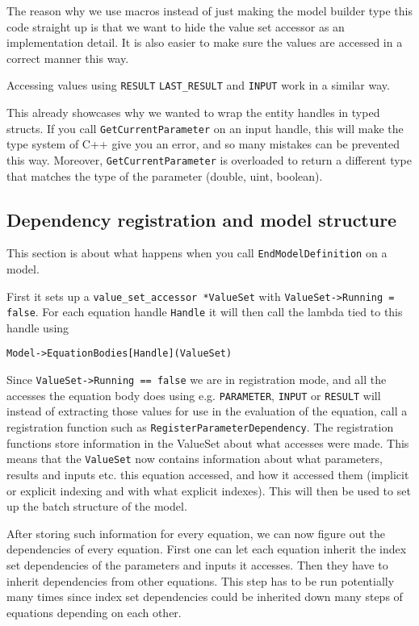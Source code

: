 \documentclass[11pt]{article}
\theoremstyle{definition}
\begin{document}
The reason why we use macros instead of just making the model builder type this code straight up is that we want to hide the value set accessor as an implementation detail. It is also easier  to make sure the values are accessed in a correct manner this way.

Accessing values using {\tt RESULT} {\tt LAST\_RESULT} and {\tt INPUT} work in a similar way.

This already showcases why we wanted to wrap the entity handles in typed structs. If you call {\tt GetCurrentParameter} on an input handle, this will make the type system of C++ give you an error, and so many mistakes can be prevented this way. Moreover, {\tt GetCurrentParameter} is overloaded to return a different type that matches the type of the parameter (double, uint, boolean).

\subsection{Dependency registration and model structure}

This section is about what happens when you call {\tt EndModelDefinition} on a model.

First it sets up a {\tt value\_set\_accessor *ValueSet} with {\tt ValueSet->Running = false}. For each equation handle {\tt Handle} it will then call the lambda tied to this handle using
\begin{lstlisting}[style=mycpp]
Model->EquationBodies[Handle](ValueSet)
\end{lstlisting}
Since {\tt ValueSet->Running == false} we are in registration mode, and all the accesses the equation body does using e.g. {\tt PARAMETER}, {\tt INPUT} or {\tt RESULT} will instead of extracting those values for use in the evaluation of the equation, call a registration function such as {\tt RegisterParameterDependency}. The registration functions store information in the ValueSet about what accesses were made. This means that the {\tt ValueSet} now contains information about what parameters, results and inputs etc. this equation accessed, and how it accessed them (implicit or explicit indexing and with what explicit indexes). This will then be used to set up the batch structure of the model.

After storing such information for every equation, we can now figure out the dependencies of every equation. First one can let each equation inherit the index set dependencies of the parameters and inputs it accesses. Then they have to inherit dependencies from other equations. This step has to be run potentially many times since index set dependencies could be inherited down many steps of equations depending on each other.
\end{document}

